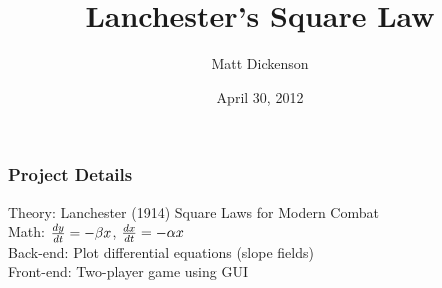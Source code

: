 \documentclass{beamer}
\title[Python Presentation]{Lanchester's
  Square Law}
\author{Matt Dickenson}
\institute[Duke University]
{
Duke University \\
\medskip
{\emph{mcd31@duke.edu}}
}
\date{April 30, 2012}
\begin{document}
%
\begin{frame}
\titlepage
\end{frame}
%
\begin{frame}
\frametitle{Project Details}

Theory: Lanchester (1914) Square Laws for Modern Combat \\
\pause
Math: $ {dy \over dt} = -\beta x$, ${dx \over dt} = -\alpha x$ \\
\pause
Back-end: Plot differential equations (slope fields) \\
\pause
Front-end: Two-player game using GUI \\

\end{frame}
%


\end{document}
